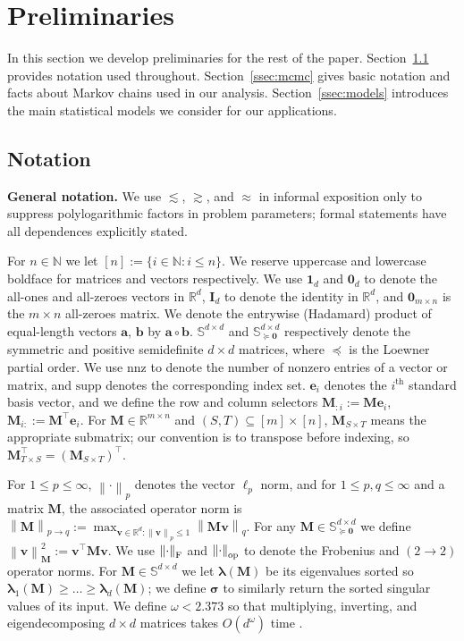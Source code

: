 \documentclass[11pt]{article}
\newcommand{\defeq}{:=}
\newcommand{\norm}[1]{\left\lVert#1\right\rVert}
\newcommand{\normop}[1]{\left\lVert#1\right\rVert_{\textup{op}}}
\newcommand{\normf}[1]{\left\lVert#1\right\rVert_{\textup{F}}}
\newcommand{\R}{\mathbb{R}}
\newcommand{\N}{\mathbb{N}}
\newcommand{\1}{\mathbf{1}}
\newcommand{\0}{\mathbf{0}}
\newcommand{\id}{\mathbf{I}}
\newcommand{\mzero}{\mathbf{0}}
\newcommand{\Sym}{\mathbb{S}}
\newcommand{\PSD}{\Sym_{\succeq \mzero}}
\newcommand{\nnz}{\mathrm{nnz}}
\newcommand{\supp}{\mathrm{supp}}
\newcommand{\vlam}{\boldsymbol{\lambda}}
\newcommand{\mm}{{\mathbf{M}}}
\newcommand{\va}{{\mathbf{a}}}
\newcommand{\vb}{{\mathbf{b}}}
\newcommand{\ve}{{\mathbf{e}}}
\newcommand{\vv}{{\mathbf{v}}}
\newcommand{\vsig}{\boldsymbol{\sigma}}
\begin{document}
\section{Preliminaries}
\label{sec:prelim}

In this section we develop preliminaries for the rest of the paper. Section~\ref{ssec:notation} provides notation used throughout. Section~\ref{ssec:mcmc} gives basic notation and facts about Markov chains used in our analysis. Section~\ref{ssec:models} introduces the main statistical models we consider for our applications.

\subsection{Notation}\label{ssec:notation}

\textbf{General notation.} We use $\lesssim$, $\gtrsim$, and $\approx$ in informal exposition only to suppress polylogarithmic factors in problem parameters; formal statements have all dependences explicitly stated.

For $n \in \N$ we let $[n] \defeq \{i \in \N: i \le n\}$.
We reserve uppercase and lowercase boldface for matrices and vectors respectively. We use $\1_d$ and $\0_d$ to denote the all-ones and all-zeroes vectors in $\R^d$, $\id_d$ to denote the identity in $\R^d$, and $\0_{m \times n}$ is the $m \times n$ all-zeroes matrix. We denote the entrywise (Hadamard) product of equal-length vectors $\va$, $\vb$ by $\va \circ \vb$. $\Sym^{d \times d}$ and $\PSD^{d \times d}$ respectively denote the symmetric and positive semidefinite $d \times d$ matrices, where $\preceq$ is the Loewner partial order. We use $\nnz$ to denote the number of nonzero entries of a vector or matrix, and $\supp$ denotes the corresponding index set. $\ve_i$ denotes the $i^{\text{th}}$ standard basis vector, and we define the row and column selectors $\mm_{:i} \defeq \mm \ve_i$, $\mm_{i:} \defeq \mm^\top \ve_i$. For $\mm \in \R^{m \times n}$ and $(S, T) \subseteq [m] \times [n]$, $\mm_{S \times T}$ means the appropriate submatrix; our convention is to transpose before indexing, so $\mm^\top_{T \times S} = (\mm_{S \times T})^\top$.

For $1 \le p \le \infty$, $\norm{\cdot}_p$ denotes the vector $\ell_p$ norm, and for $1 \le p, q \le \infty$ and a matrix $\mm$, the associated operator norm is $\norm{\mm}_{p \to q} \defeq \max_{\vv \in \R^d: \norm{\vv}_p \le 1} \norm{\mm\vv}_{q}$. For any $\mm \in \PSD^{d \times d}$ we define $\norm{\vv}_{\mm}^2 \defeq \vv^\top \mm \vv$. We use $\normf{\cdot}$ and $\normop{\cdot}$ to denote the Frobenius and $(2 \to 2)$ operator norms. For $\mm \in \Sym^{d \times d}$ we let $\vlam(\mm)$ be its eigenvalues sorted so $\vlam_1(\mm) \ge \ldots \ge \vlam_d(\mm)$; we define $\vsig$ to similarly return the sorted singular values of its input. We define $\omega < 2.373$ \cite{AlmanDWXXZ25} so that multiplying, inverting, and eigendecomposing $d \times d$ matrices takes $O(d^\omega)$ time \cite{Strassen69, PanC99}.
\end{document}
